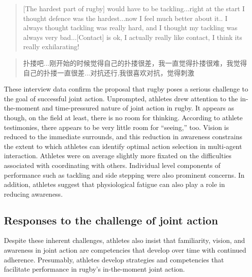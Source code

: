 \begin{CJK}{UTF8}{gbsn}
\begin{quote}
  [The hardest part of rugby] would have to be tackling...right at the start I thought defence was the hardest...now I feel much better about it.. I always thought tackling was really hard, and I thought my tackling was always very bad...[Contact] is ok, I actually really like contact, I think its really exhilarating!
\end{quote}

\begin{quote}
  扑搂吧...刚开始的时候觉得自己的扑搂很差，我一直觉得扑搂很难，我觉得自己的扑搂一直很差...对抗还行,我很喜欢对抗，觉得刺激
\end{quote}

These interview data confirm the proposal that rugby poses a serious  challenge to the goal of successful joint action.  Unprompted, athletes drew attention to the in-the-moment and time-pressured nature of joint action in rugby.  It appears as though, on the field at least, there is no room for thinking.  According to athlete testimonies, there appears to be very little room for ``seeing,'' too.  Vision is reduced to the immediate surrounds, and this reduction in awareness constrains the extent to which athletes can identify optimal action selection in multi-agent interaction.  Athletes were on average slightly more fixated on the difficulties associated with coordinating with others.  Individual level components of performance such as tackling and side stepping were also prominent concerns. In addition, athletes suggest that physiological fatigue can also play a role in reducing awareness.




\subsection{Responses to the challenge of joint action}

Despite these inherent challenges, athletes also insist that familiarity, vision, and awareness in joint action are competencies that develop over time with continued adherence.  Presumably, athletes develop strategies and competencies that facilitate performance in rugby's in-the-moment joint action.


\end{CJK}
